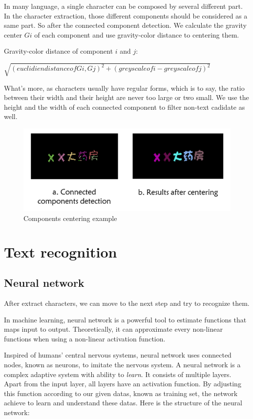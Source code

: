 \documentclass[paper=a4, french, 11pt]{scrartcl}
\begin{document}
In many language, a single character can be composed by several different part. In the character extraction, those different components should be considered as a same part. So after the connected component detection. We calculate the gravity center $G{i}$ of each component and use gravity-color distance to centering them.

Gravity-color distance of component $ i$ and $ j$:

$\sqrt{(euclidien distance of G{i}, G{j})^2 + (greyscale of i - greyscale of j)^2}$

What's more, as characters usually have regular forms, which is to say, the ratio between their width and their height are never too large or two small. We use the height and the width of each connected component to filter non-text cadidate as well. 

\begin{figure}[h]
\begin{center}
   \includegraphics[width=0.9\linewidth]{component_centering_example.png}
\end{center}
\vspace{-4ex}
\caption{Components centering example}
\label{fig:heatmap}
\end{figure} 

\section{Text recognition}
\subsection{Neural network}
After extract characters, we can move to the next step and try to recognize them.

In machine learning, neural network is a powerful tool to estimate functions that maps input to output. Theoretically, it can approximate every non-linear functions when using a non-linear activation function. 

Inspired of humans' central nervous systems, neural network uses connected nodes, known as neurons, to imitate the nervous system. A neural network is a complex adaptive system with ability to \textit{learn}. It consists of multiple layers. Apart from the input layer, all layers have an activation function. By adjusting this function according to our given datas, known as training set, the network achieve to learn and understand these datas. Here is the structure of the neural network:
\end{document}
